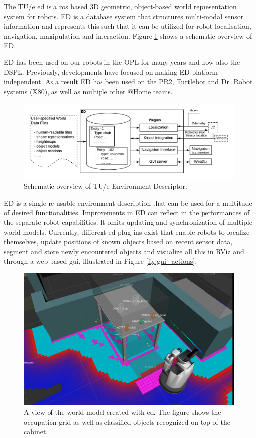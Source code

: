 \label{sec:ed}
The TU/e \acrfull{ed} is a \acrfull{ros} based 3D geometric, object-based world representation system for robots. ED is a database system that structures multi-modal sensor information and represents this such that it can be utilized for robot localisation, navigation, manipulation and interaction. Figure \ref{fig:ed} shows a schematic overview of ED.

ED has been used on our robots in the OPL for many years and now also the DSPL. Previously, developments have focused on making ED platform independent. As a result ED has been used on the PR2, Turtlebot and Dr. Robot systems (X80), as well as multiple other @Home teams.
\begin{figure}[h]
	\includegraphics[width = 0.9\linewidth]{Figures/ed_overview}
	\caption{Schematic overview of TU/e Environment Descriptor.}
	\label{fig:ed}
\end{figure}
ED is a single re-usable environment description that can be used for a multitude of desired functionalities. Improvements in ED can reflect in the performances of the separate robot capabilities. It omits updating and synchronization of multiple world models. Currently, different \acrshort{ed} plug-ins exist that enable robots to localize themselves, update positions of known objects based on recent sensor data, segment and store newly encountered objects and visualize all this in RViz and through a web-based \acrshort{gui}, illustrated in Figure \ref{fig:gui_actions}.
\begin{figure}[h]
\centering
	\includegraphics[width = 0.8\linewidth]{Figures/ed_segmentation_hsr}
	\caption{A view of the world model created with \acrshort{ed}. The figure shows the occupation grid as well as classified objects recognized on top of the cabinet.}
	\label{fig:ed_segmentation}
\end{figure}
